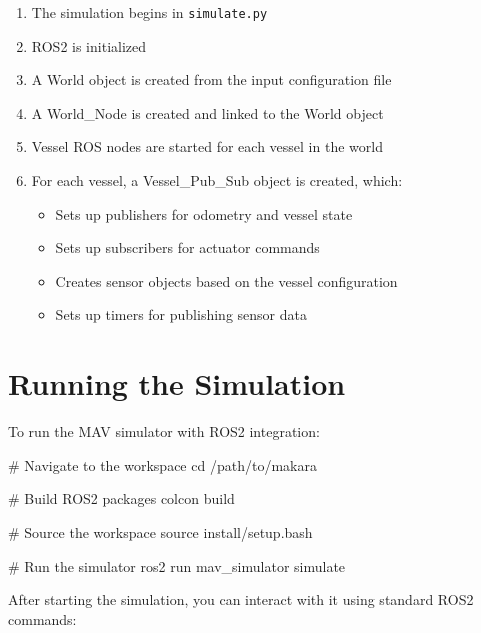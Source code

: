 \documentclass[
  letterpaper,
  DIV=11,
  numbers=noendperiod]{scrreprt}
\newenvironment{Shaded}{\begin{snugshade}}{\end{snugshade}}
\newcommand{\BuiltInTok}[1]{\textcolor[rgb]{0.00,0.23,0.31}{#1}}
\newcommand{\CommentTok}[1]{\textcolor[rgb]{0.37,0.37,0.37}{#1}}
\newcommand{\ExtensionTok}[1]{\textcolor[rgb]{0.00,0.23,0.31}{#1}}
\newcommand{\NormalTok}[1]{\textcolor[rgb]{0.00,0.23,0.31}{#1}}
\providecommand{\tightlist}{%
  \setlength{\itemsep}{0pt}\setlength{\parskip}{0pt}}\usepackage{longtable,booktabs,array}
\begin{document}
\begin{enumerate}
\def\labelenumi{\arabic{enumi}.}
\tightlist
\item
  The simulation begins in \texttt{simulate.py}
\item
  ROS2 is initialized
\item
  A World object is created from the input configuration file
\item
  A World\_Node is created and linked to the World object
\item
  Vessel ROS nodes are started for each vessel in the world
\item
  For each vessel, a Vessel\_Pub\_Sub object is created, which:

  \begin{itemize}
  \tightlist
  \item
    Sets up publishers for odometry and vessel state
  \item
    Sets up subscribers for actuator commands
  \item
    Creates sensor objects based on the vessel configuration
  \item
    Sets up timers for publishing sensor data
  \end{itemize}
\end{enumerate}

\section*{Running the Simulation}\label{running-the-simulation}


To run the MAV simulator with ROS2 integration:

\begin{Shaded}
\begin{Highlighting}[]
\CommentTok{\# Navigate to the workspace}
\BuiltInTok{cd}\NormalTok{ /path/to/makara}

\CommentTok{\# Build ROS2 packages}
\ExtensionTok{colcon}\NormalTok{ build}

\CommentTok{\# Source the workspace}
\BuiltInTok{source}\NormalTok{ install/setup.bash}

\CommentTok{\# Run the simulator}
\ExtensionTok{ros2}\NormalTok{ run mav\_simulator simulate}
\end{Highlighting}
\end{Shaded}

After starting the simulation, you can interact with it using standard
ROS2 commands:
\end{document}
